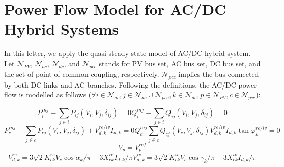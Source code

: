 \documentclass[lettersize,journal]{IEEEtran}
\begin{document}
\vspace{-0.8em}
\section{Power Flow Model for AC/DC Hybrid Systems}
In this letter, we apply the quasi-steady state model of AC/DC hybrid system. Let $\mathcal{N}_{PV}$, $\mathcal{N}_{ac}$, $\mathcal{N}_{dc}$, and $\mathcal{N}_{pcc}$ stands for PV bus set, AC bus set, DC bus set, and the set of point of common coupling, respectively. $\mathcal{N}_{pcc}$ implies the bus connected by both DC links and AC branches. Following the definitions, the AC/DC power flow is modelled as follows ($\forall i  \in   \mathcal{N}_{ac},  j  \in  \mathcal{N}_{ac} \cup  \mathcal{N}_{pcc}, k  \in   \mathcal{N}_{dc}, p \in  \mathcal{N}_{PV}, c \in  \mathcal{N}_{pcc}$):

\begin{subequations}     \label{eq_1}
\begin{equation} 
\label{eq_1a}
P_{i}^{inj} - \sum_{j\in i} P_{ij}(V_{i},V_{j},\delta_{ij}) = 0
\end{equation}
\begin{equation}   
\label{eq_1b}
Q_{i}^{inj} - \sum_{j\in i} Q_{ij}(V_{i},V_{j},\delta_{ij}) = 0
\end{equation}
\end{subequations}
\begin{subequations}     
\label{eq_2}
\begin{equation} 
\label{eq_2a}
P_{c}^{inj} - \sum_{j\in c} P_{cj}(V_{c},V_{j},\delta_{ij}) \pm  V_{d,k}^{re/iv}I_{d,k}  = 0
\end{equation}
\begin{equation}   
\label{eq_2b}
 Q_{c}^{inj} \sum_{j\in c} Q_{cj}(V_{c},V_{j},\delta_{ij}) V_{d, k}^{re/iv}   I_{d,k}   \tan  \varphi  _{k} ^{re/iv} = 0
\end{equation}
\end{subequations}
\begin{equation}
\label{deqn_ex3}
V_{p} = V_{p}^{ref}
\end{equation}
\begin{subequations}
    \label{eq_4}
    \begin{equation} 
    \label{eq_4a}
    V_{d,k}^{re} =  {3\sqrt{2}}K_{ck}^{re} V_{c} \cos\alpha_{k} / {\pi}  -  {3}X_{ck}^{re} I_{d,k} / {\pi}
    \end{equation}
    \begin{equation} 
    \label{eq_4b}
    V_{d,k}^{iv} =  {3\sqrt{2}}K_{ck}^{iv} V_{c} \cos\gamma_{k} / {\pi}  -  {3}X_{ck}^{iv} I_{d,k} / {\pi}
    \end{equation}
\end{subequations}
\end{document}
